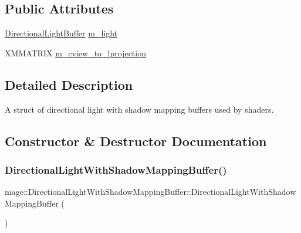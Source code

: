 \subsection*{Public Attributes}
\begin{DoxyCompactItemize}
\item 
\hyperlink{structmage_1_1_directional_light_buffer}{Directional\+Light\+Buffer} \hyperlink{structmage_1_1_directional_light_with_shadow_mapping_buffer_a911c958b0e442c927f6e8f8f73d9dbe1}{m\+\_\+light}
\item 
X\+M\+M\+A\+T\+R\+IX \hyperlink{structmage_1_1_directional_light_with_shadow_mapping_buffer_a73101e32d19de54846c3075b45ab5566}{m\+\_\+cview\+\_\+to\+\_\+lprojection}
\end{DoxyCompactItemize}


\subsection{Detailed Description}
A struct of directional light with shadow mapping buffers used by shaders. 

\subsection{Constructor \& Destructor Documentation}
\hypertarget{structmage_1_1_directional_light_with_shadow_mapping_buffer_a4657f8c201fda21988dea072c70615bb}{}\label{structmage_1_1_directional_light_with_shadow_mapping_buffer_a4657f8c201fda21988dea072c70615bb} 
\subsubsection{\texorpdfstring{Directional\+Light\+With\+Shadow\+Mapping\+Buffer()}{DirectionalLightWithShadowMappingBuffer()}\hspace{0.1cm}{\footnotesize\ttfamily [1/3]}}
{\footnotesize\ttfamily mage\+::\+Directional\+Light\+With\+Shadow\+Mapping\+Buffer\+::\+Directional\+Light\+With\+Shadow\+Mapping\+Buffer (\begin{DoxyParamCaption}{ }\end{DoxyParamCaption})}

